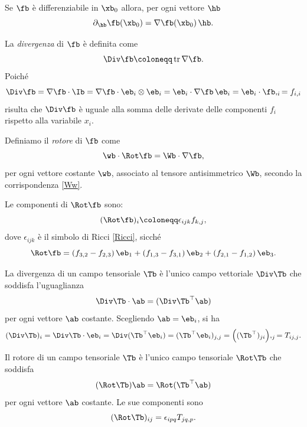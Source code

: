 Se $\fb$ è differenziabile in $\xb_0$ allora, per ogni vettore $\hb$
\begin{equation}
\partial_{\hb}\fb (\xb_0)=\nabla\fb (\xb_0)\, \hb.
\end{equation}

La \textit{divergenza} di $\fb$ è definita come
\begin{equation}
	\Div \fb \coloneqq \operatorname{tr}\nabla \fb.
\end{equation}
Poiché
\begin{equation}
	\Div \fb=\nabla\fb \cdot \Ib =\nabla \fb \cdot \eb_i \otimes \eb_i =\eb_i \cdot \nabla \fb \,\eb_i =\eb_i\cdot \fb,_i= f_{i,i}
\end{equation}
 risulta che $	\Div \fb$ è uguale alla somma delle derivate delle componenti $f_i$ rispetto alla variabile $x_i$.

Definiamo il \textit{rotore} di $\fb$ come
\begin{equation}
\wb \cdot \Rot \fb = \Wb \cdot \nabla \fb,
\end{equation}
per ogni vettore costante $\wb$, associato al tensore antisimmetrico $\Wb$, secondo la corrispondenza \eqref{Ww}.

Le componenti di $\Rot \fb$ sono:
\begin{equation}
(\Rot \fb)_i\coloneqq\epsilon_{ijk}f_{k,j},
\end{equation}
dove $\epsilon_{ijk}$ è il simbolo di Ricci \eqref{Ricci}, sicché
\begin{equation}
\Rot \fb=(f_{3,2}-f_{2,3})\,\eb_{1}+(f_{1,3}-f_{3,1})\,\eb_2 + (f_{2,1}-f_{1,2})\,\eb_3.
\end{equation}

La divergenza di un campo tensoriale $\Tb$ è l'unico campo vettoriale $\Div \Tb$ che soddisfa l'uguaglianza
\begin{equation}
\Div \Tb \cdot \ab =(\Div \Tb ^\top \ab)
\end{equation}
per ogni vettore $\ab$ costante. Scegliendo $\ab = \eb_i$, si ha
\begin{equation}
(\Div \Tb)_i=\Div \Tb \cdot\eb_i =\Div (\Tb^\top \eb_i)=(\Tb^\top \eb_i)_{j,j}=\Big((\Tb ^\top)_{ji}\Big),_{j}=T_{ij,j}.
\end{equation}

Il rotore di un campo tensoriale $\Tb$ è l'unico campo tensoriale $\Rot \Tb$ che soddisfa
\begin{equation}\label{RotT}
(\Rot \Tb) \ab =\Rot (\Tb ^\top \ab)
\end{equation} 
per ogni vettore $\ab$ costante. Le sue componenti sono
\begin{equation}
	(\Rot \Tb)_{ij}=\epsilon_{ipq}T_{jq,p}.
\end{equation}


